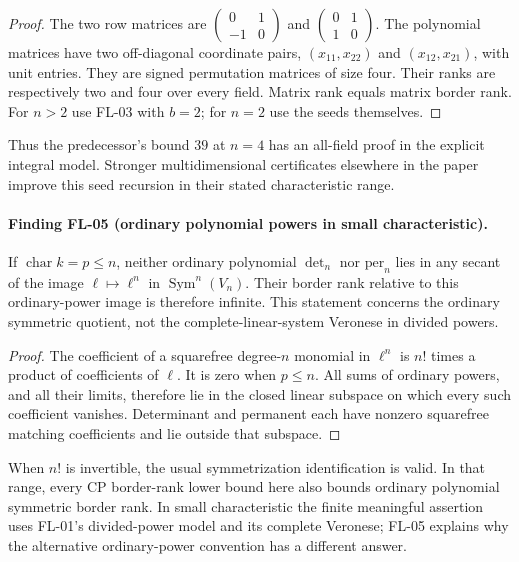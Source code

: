 \begin{proof}
The two row matrices are
$\left(\begin{smallmatrix}0&1\\-1&0\end{smallmatrix}\right)$
and $\left(\begin{smallmatrix}0&1\\1&0\end{smallmatrix}\right)$.
The polynomial matrices have two off-diagonal coordinate pairs,
$(x_{11},x_{22})$ and $(x_{12},x_{21})$, with unit entries.
They are signed permutation matrices of size four. Their ranks
are respectively two and four over every field. Matrix rank
equals matrix border rank. For $n>2$ use FL-03 with $b=2$;
for $n=2$ use the seeds themselves.
\end{proof}

Thus the predecessor's bound $39$ at $n=4$ has an all-field
proof in the explicit integral model. Stronger multidimensional
certificates elsewhere in the paper improve this seed recursion
in their stated characteristic range.

\paragraph{Finding FL-05 (ordinary polynomial powers in small characteristic).}
If $\operatorname{char}k=p\leq n$, neither ordinary polynomial
$\det_n$ nor $\mathrm{per}_n$ lies in any secant of the image
$\ell\mapsto\ell^n$ in $\operatorname{Sym}^n(V_n)$.
Their border rank relative to this ordinary-power image is
therefore infinite. This statement concerns the ordinary symmetric
quotient, not the complete-linear-system Veronese in divided powers.

\begin{proof}
The coefficient of a squarefree degree-$n$ monomial in $\ell^n$
is $n!$ times a product of coefficients of $\ell$. It is zero
when $p\leq n$. All sums of ordinary powers, and all their limits,
therefore lie in the closed linear subspace on which every such
coefficient vanishes. Determinant and permanent each have nonzero
squarefree matching coefficients and lie outside that subspace.
\end{proof}

When $n!$ is invertible, the usual symmetrization identification
is valid. In that range, every CP border-rank lower bound here
also bounds ordinary polynomial symmetric border rank. In small
characteristic the finite meaningful assertion uses FL-01's
divided-power model and its complete Veronese; FL-05 explains why
the alternative ordinary-power convention has a different answer.
